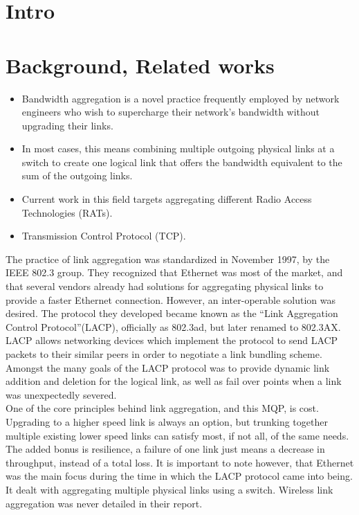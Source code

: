 \documentclass[12pt]{article}
\begin{document}
\section{Intro}


\section{Background, Related works}

	\begin{itemize}
		\item Bandwidth aggregation is a novel practice frequently employed by network engineers who wish to supercharge their network's bandwidth without upgrading their links. 
		\item In most cases, this means combining multiple outgoing physical links at a switch to create one logical link that offers the bandwidth equivalent to the sum of the outgoing links. 
		\item Current work in this field targets aggregating different Radio Access Technologies (RATs).
		\item Transmission Control Protocol (TCP).
	\end{itemize}


	The practice of link aggregation was standardized in November 1997, by the IEEE 802.3 group. They recognized that Ethernet was most of the market, and that several vendors already had solutions for aggregating physical links to provide a faster Ethernet connection. However, an inter-operable solution was desired. The protocol they developed became known as the ``Link Aggregation Control Protocol''(LACP), officially as 802.3ad, but later renamed to 802.3AX. LACP allows networking devices which implement the protocol to send LACP packets to their similar peers in order to negotiate a link bundling scheme. Amongst the many goals of the LACP protocol was to provide dynamic link addition and deletion for the logical link, as well as fail over points when a link was unexpectedly severed. \\

	One of the core principles behind link aggregation, and this MQP, is cost. Upgrading to a higher speed link is always an option, but trunking together multiple existing lower speed links can satisfy most, if not all, of the same needs. The added bonus is resilience, a failure of one link just means a decrease in throughput, instead of a total loss. It is important to note however, that Ethernet was the main focus during the time in which the LACP protocol came into being. It dealt with aggregating multiple physical links using a switch. Wireless link aggregation was never detailed in their report. \\
\end{document}
